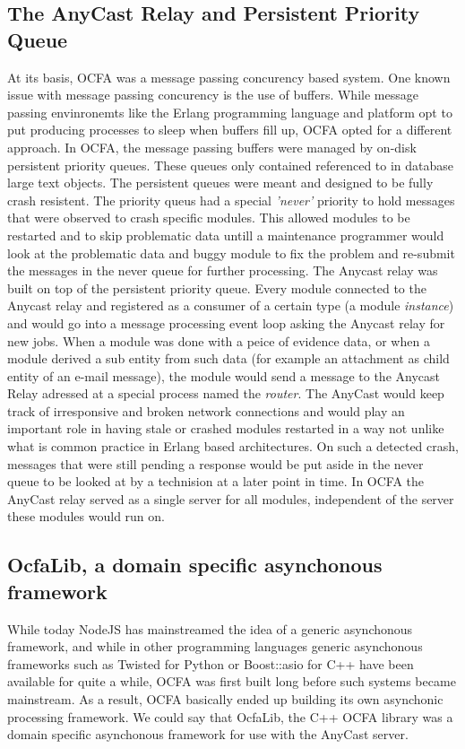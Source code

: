 \subsection{The AnyCast Relay and Persistent Priority Queue}
At its basis, OCFA was a message passing concurency based system. One known issue with message passing concurency is the use of buffers. While message passing envinronemts like the Erlang programming language and platform opt to put producing processes to sleep when buffers fill up, OCFA opted for a different approach. In OCFA, the message passing buffers were managed by on-disk persistent priority queues. These queues only contained referenced to in database large text objects. The persistent queues were meant and designed to be fully crash resistent. The priority queus had a special \emph{'never'} priority to hold messages that were observed to crash specific modules. This allowed modules to be restarted and to skip problematic data untill a maintenance programmer would look at the problematic data and buggy module to fix the problem and re-submit the messages in the never queue for further processing. The Anycast relay was built on top of the persistent priority queue. Every module connected to the Anycast relay and registered as a consumer of a certain type (a module \emph{instance}) and would go into a message processing event loop asking the Anycast relay for new jobs. When a module was done with a peice of evidence data, or when a module derived a sub entity from such data (for example an attachment as child entity of an e-mail message), the module would send a message to the Anycast Relay adressed at a special process named the \emph{router}. The AnyCast would keep track of irresponsive and broken network connections and would play an important role in having stale or crashed modules restarted in a way not unlike what is common practice in Erlang based architectures. On such a detected crash, messages that were still pending a response would be put aside in the never queue to be looked at by a technision at a later point in time. In OCFA the AnyCast relay served as a single server for all modules, independent of the server these modules would run on.
\subsection{OcfaLib, a domain specific asynchonous framework}
While today NodeJS has mainstreamed the idea of a generic asynchonous framework, and while in other programming languages generic asynchonous frameworks such as Twisted for Python or Boost::asio for C++ have been available for quite a while, OCFA was first built long before such systems became mainstream. As a result, OCFA basically ended up building its own asynchonic processing framework. We could say that OcfaLib, the C++ OCFA library was a domain specific asynchonous framework for use with the AnyCast server. 
